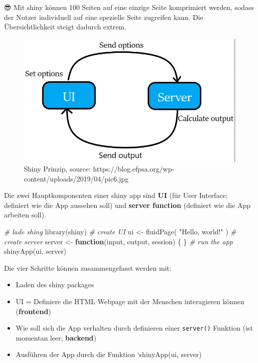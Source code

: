 \documentclass[
]{article}
\newenvironment{Shaded}{\begin{snugshade}}{\end{snugshade}}
\newcommand{\CommentTok}[1]{\textcolor[rgb]{0.56,0.35,0.01}{\textit{#1}}}
\newcommand{\ControlFlowTok}[1]{\textcolor[rgb]{0.13,0.29,0.53}{\textbf{#1}}}
\newcommand{\FunctionTok}[1]{\textcolor[rgb]{0.00,0.00,0.00}{#1}}
\newcommand{\NormalTok}[1]{#1}
\newcommand{\OtherTok}[1]{\textcolor[rgb]{0.56,0.35,0.01}{#1}}
\newcommand{\StringTok}[1]{\textcolor[rgb]{0.31,0.60,0.02}{#1}}
\providecommand{\tightlist}{%
  \setlength{\itemsep}{0pt}\setlength{\parskip}{0pt}}
\begin{document}
😎 Mit shiny können 100 Seiten auf eine einzige Seite komprimiert werden, sodass der Nutzer individuell auf eine spezielle Seite zugreifen kann. Die Übersichtlichkeit steigt dadurch extrem.

\begin{figure}

{\centering \includegraphics[width=1\linewidth]{images/081} 

}

\caption{Shiny Prinzip, source: https://blog.efpsa.org/wp-content/uploads/2019/04/pic6.jpg}\label{fig:unnamed-chunk-315}
\end{figure}

Die zwei Hauptkomponenten einer shiny app sind \textbf{UI} (für User Interface; definiert wie die App aussehen soll) und \textbf{server function} (definiert wie die App arbeiten soll).

\begin{Shaded}
\begin{Highlighting}[]
\CommentTok{\# lade shiny}
\FunctionTok{library}\NormalTok{(shiny)}
\CommentTok{\# create UI}
\NormalTok{ui }\OtherTok{\textless{}{-}} \FunctionTok{fluidPage}\NormalTok{(}
  \StringTok{"Hello, world!"}
\NormalTok{)}
\CommentTok{\# create server}
\NormalTok{server }\OtherTok{\textless{}{-}} \ControlFlowTok{function}\NormalTok{(input, output, session) \{}
\NormalTok{\}}
\CommentTok{\# run the app}
\FunctionTok{shinyApp}\NormalTok{(ui, server)}
\end{Highlighting}
\end{Shaded}

Die vier Schritte können zusammengefasst werden mit:

\begin{itemize}
\tightlist
\item
  Laden des shiny packages
\item
  UI = Definiere die HTML Webpage mit der Menschen interagieren können (\textbf{frontend})
\item
  Wie soll sich die App verhalten durch definieren einer \texttt{server()} Funktion (ist momentan leer; \textbf{backend})
\item
  Ausführen der App durch die Funktion `shinyApp(ui, server)
\end{itemize}
\end{document}
